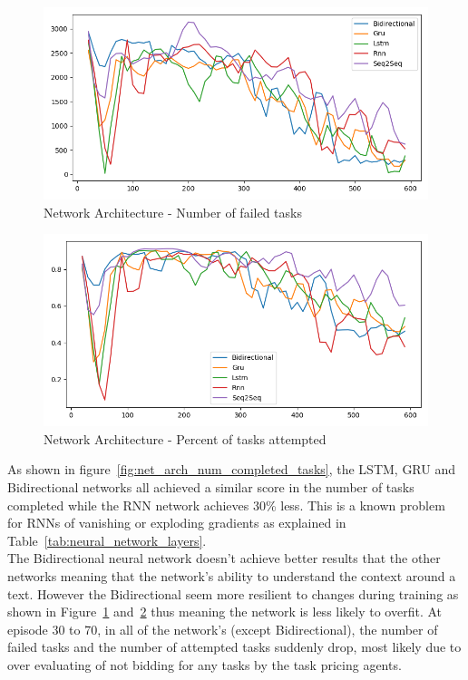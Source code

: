 \begin{figure}[H]
    \centering
    \includegraphics[width=\linewidth]{figures/5_evaluation_figs/net_arch_training_fig/num_failed_tasks.png}
    \caption{Network Architecture - Number of failed tasks}
    \label{fig:net_arch_num_failed_tasks}
\end{figure}

\begin{figure}[H]
    \centering
    \includegraphics[width=\linewidth]{figures/5_evaluation_figs/net_arch_training_fig/percent_tasks.png}
    \caption{Network Architecture - Percent of tasks attempted}
    \label{fig:net_arch_percent_tasks}
\end{figure}

As shown in figure~\ref{fig:net_arch_num_completed_tasks}, the LSTM, GRU and Bidirectional networks all achieved a
similar score in the number of tasks completed while the RNN network achieves 30\% less. This is a known problem for
RNNs of vanishing or exploding gradients as explained in Table~\ref{tab:neural_network_layers}. \\
The Bidirectional neural network doesn't achieve better results that the other networks meaning that the network's
ability to understand the context around a text. However the Bidirectional seem more resilient to changes during
training as shown in Figure~\ref{fig:net_arch_num_failed_tasks} and~\ref{fig:net_arch_percent_tasks} thus meaning the
network is less likely to overfit. At episode 30 to 70, in all of the network's (except Bidirectional), the number of
failed tasks and the number of attempted tasks suddenly drop, most likely due to over evaluating of not bidding for any
tasks by the task pricing agents.
